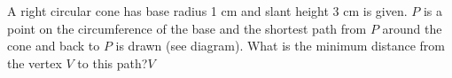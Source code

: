 A right circular cone has base radius 1 cm and slant height 3 cm is given.  $P$ is a point on the circumference of the base and the shortest path from $P$ around the cone and back to $P$ is drawn (see diagram).  What is the minimum distance from the vertex $V$ to this path?$V$